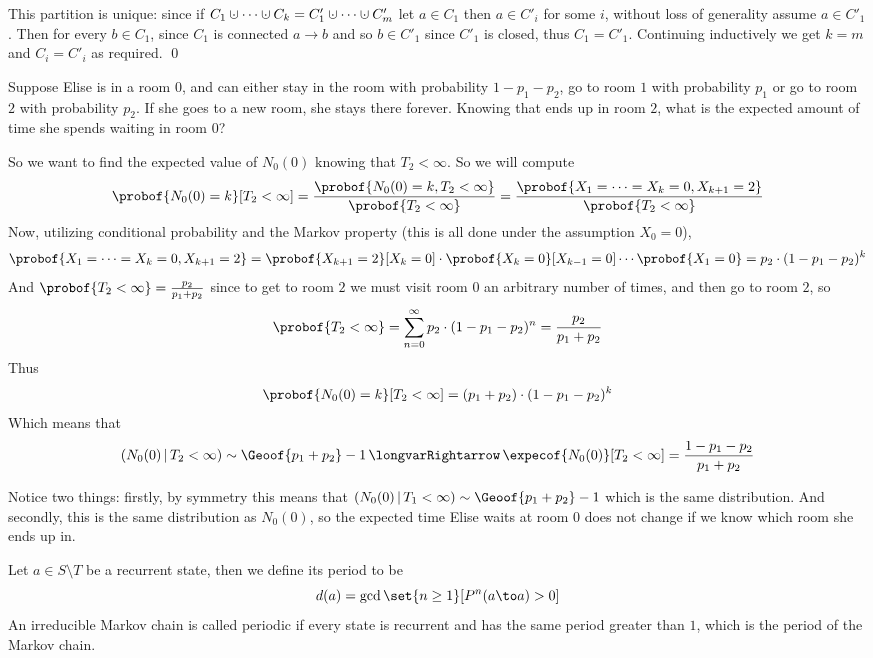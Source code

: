This partition is unique: since if $C_1\dcup\cdots\dcup C_k=C'_1\dcup\cdots\dcup C'_m$ let $a\in C_1$ then $a\in C'_i$ for some $i$, without loss of generality assume $a\in C'_1$.
Then for every $b\in C_1$, since $C_1$ is connected $a\to b$ and so $b\in C'_1$ since $C'_1$ is closed, thus $C_1=C'_1$.
Continuing inductively we get $k=m$ and $C_i=C'_i$ as required.
\qed

\bexam

    Suppose Elise is in a room $0$, and can either stay in the room with probability $1-p_1-p_2$, go to room $1$ with probability $p_1$ or go to room $2$ with probability $p_2$.
    If she goes to a new room, she stays there forever.
    Knowing that ends up in room $2$, what is the expected amount of time she spends waiting in room $0$?

    So we want to find the expected value of $N_0(0)$ knowing that $T_2<\infty$.
    So we will compute
    $$ \probof{N_0(0)=k}[T_2<\infty] = \frac{\probof{N_0(0)=k,T_2<\infty}}{\probof{T_2<\infty}} = \frac{\probof{X_1=\cdots=X_k=0,X_{k+1}=2}}{\probof{T_2<\infty}} $$
    Now, utilizing conditional probability and the Markov property (this is all done under the assumption $X_0=0$),
    $$ \probof{X_1=\cdots=X_k=0,X_{k+1}=2} = \probof{X_{k+1}=2}[X_k=0]\cdot\probof{X_k=0}[X_{k-1}=0]\cdots\probof{X_1=0} = p_2\cdot(1-p_1-p_2)^k $$
    And $\probof{T_2<\infty}=\frac{p_2}{p_1+p_2}$ since to get to room $2$ we must visit room $0$ an arbitrary number of times, and then go to room $2$, so
    $$ \probof{T_2<\infty} = \sum_{n=0}^\infty p_2\cdot(1-p_1-p_2)^n = \frac{p_2}{p_1+p_2} $$
    Thus
    $$ \probof{N_0(0)=k}[T_2<\infty] = (p_1+p_2)\cdot(1-p_1-p_2)^k $$
    Which means that
    $$ (N_0(0)\,|\,T_2<\infty) \sim \Geoof{p_1+p_2} - 1 \implies \expecof{N_0(0)}[T_2<\infty] = \frac{1-p_1-p_2}{p_1+p_2} $$

    Notice two things: firstly, by symmetry this means that $(N_0(0)\,|\,T_1<\infty)\sim\Geoof{p_1+p_2}-1$ which is the same distribution.
    And secondly, this is the same distribution as $N_0(0)$, so the expected time Elise waits at room $0$ does not change if we know which room she ends up in.

\eexam

\bdefn

    Let $a\in S\setminus T$ be a recurrent state, then we define its {\emphcolor period} to be
    $$ d(a) = \gcd\set{n\geq 1}[P^n(a\to a)>0] $$
    An irreducible Markov chain is called {\emphcolor periodic} if every state is recurrent and has the same period greater than $1$, which is the {\emphcolor period} of the Markov chain.

